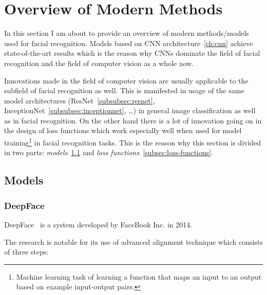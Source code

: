 \section{Overview of Modern Methods}\label{sec:mod-methods}
In this section I am about to provide an overview of modern methods/models used for facial recognition.
Models based on CNN architecture~\ref{ch:cnn} achieve state-of-the-art results which is the reason why CNNs dominate the
field of facial recognition and the field of computer vision as a whole now.

Innovations made in the field of computer vision are usually applicable to the subfield of facial recognition as well.
This is manifested in usage of the same model architectures (ResNet~\ref{subsubsec:resnet},
InceptionNet~\ref{subsubsec:inceptionnet}, \ldots) in general image classification as well as in facial recognition.
On the other hand there is a lot of innovation going on in the design of loss functions which work especially well
when used for model training\footnote{Machine learning task of learning a function that maps an input to an output
based on example input-output pairs.} in facial recognition tasks.
This is the reason why this section is divided in two parts: \textit{models}~\ref{subsec:models} and
\textit{loss functions}~\ref{subsec:loss-functions}.

\subsection{Models}\label{subsec:models}

\subsubsection{DeepFace}\label{subsubsec:deepface}
DeepFace~\cite{DeepFace} is a system developed by FaceBook Inc. in 2014.

The research is notable for its use of advanced alignment technique which consists of three steps:


